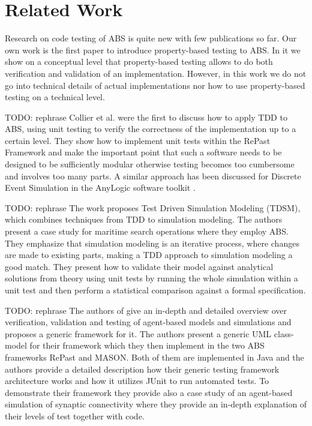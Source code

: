 \section{Related Work}
\label{sec:related}

Research on code testing of ABS is quite new with few publications so far. Our own work \cite{thaler_show_2019} is the first paper to introduce property-based testing to ABS. In it we show on a conceptual level that property-based testing allows to do both verification and validation of an implementation. However, in this work we do not go into technical details of actual implementations nor how to use property-based testing on a technical level.

TODO: rephrase
Collier et al. \cite{collier_test-driven_2013} were the first to discuss how to apply TDD to ABS, using unit testing \cite{beck_test_2002} to verify the correctness of the implementation up to a certain level. They show how to implement unit tests within the RePast Framework  and make the important point that such a software needs to be designed to be sufficiently modular otherwise testing becomes too cumbersome and involves too many parts. A similar approach has been discussed for Discrete Event Simulation in the AnyLogic software toolkit \cite{asta_investigation_2014}. 

TODO: rephrase
The work \cite{onggo_test-driven_2016} proposes Test Driven Simulation Modeling (TDSM), which combines techniques from TDD to simulation modeling. The authors present a case study for maritime search operations where they employ ABS. They emphasize that simulation modeling is an iterative process, where changes are made to existing parts, making a TDD approach to simulation modeling a good match. They present how to validate their model against analytical solutions from theory using unit tests by running the whole simulation within a unit test and then perform a statistical comparison against a formal specification.

TODO: rephrase
The authors of \cite{gurcan_generic_2013} give an in-depth and detailed overview over verification, validation and testing of agent-based models and simulations and proposes a generic framework for it. The authors present a generic UML class-model for their framework which they then implement in the two ABS frameworks RePast and MASON. Both of them are implemented in Java and the authors provide a detailed description how their generic testing framework architecture works and how it utilizes JUnit to run automated tests. To demonstrate their framework they provide also a case study of an agent-based simulation of synaptic connectivity where they provide an in-depth explanation of their levels of test together with code.

